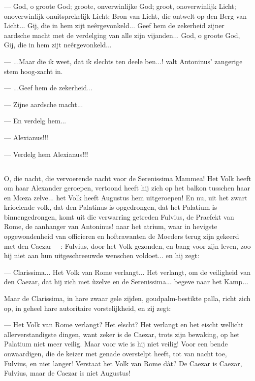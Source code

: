 \documentclass[a4paper, 12pt, oneside, dutch]{article}
\begin{document}
--- God, o groote God; groote, onverwinlijke God; groot, onoverwinlijk Licht; onoverwinlijk onuitsprekelijk Licht; Bron van Licht, die ontwelt op den Berg van Licht... Gij, die in hem zijt neêrgevonkeld... Geef hem de zekerheid zijner aardsche macht met de verdelging van alle zijn vijanden... God, o groote God, Gij, die in hem zijt neêrgevonkeld...

--- ...Maar die ik weet, dat ik slechts ten deele ben...! valt Antoninus' zangerige stem hoog-zacht in.

--- ...Geef hem de zekerheid...

--- Zijne aardsche macht...

--- En verdelg hem...

--- Alexianus!!!

--- Verdelg hem Alexianus!!!

\subsection{}
\paragraph{}
O, die nacht, die vervoerende nacht voor de Serenissima Mammea! Het Volk heeft om haar Alexander geroepen, vertoond heeft hij zich op het balkon tusschen haar en Mœza zelve... het Volk heeft Augustus hem uitgeroepen! En nu, uit het zwart krioelende volk, dat den Palatinus is opgedrongen, dat het Palatium is binnengedrongen, komt uit die verwarring getreden Fulvius, de Praefekt van Rome, de aanhanger van Antoninus! naar het atrium, waar in hevigste opgewondenheid van officieren en hoftrawanten de Moeders terug zijn gekeerd met den Caezar ---: Fulvius, door het Volk gezonden, en bang voor zijn leven, zoo hij niet aan hun uitgeschreeuwde wenschen voldoet... en hij zegt:

--- Clarissima... Het Volk van Rome verlangt... Het verlangt, om de veiligheid van den Caezar, dat hij zich met ùzelve en de Serenissima... begeve naar het Kamp...

Maar de Clarissima, in hare zwaar gele zijden, goudpalm-bestikte palla, richt zich op, in geheel hare autoritaire vorstelijkheid, en zij zegt:

--- Het Volk van Rome verlangt? Het eìscht? Het verlangt en het eischt wellicht allerverstandigste dingen, want zeker is de Caezar, trots zijn bewaking, op het Palatium niet meer veilig. Maar voor wie is hij niet veilig! Voor een bende onwaardigen, die de keizer met genade overstelpt heeft, tot van nacht toe, Fulvius, en niet langer! Verstaat het Volk van Rome dàt? De Caezar is Caezar, Fulvius, maar de Caezar is niet Augustus!
\end{document}
